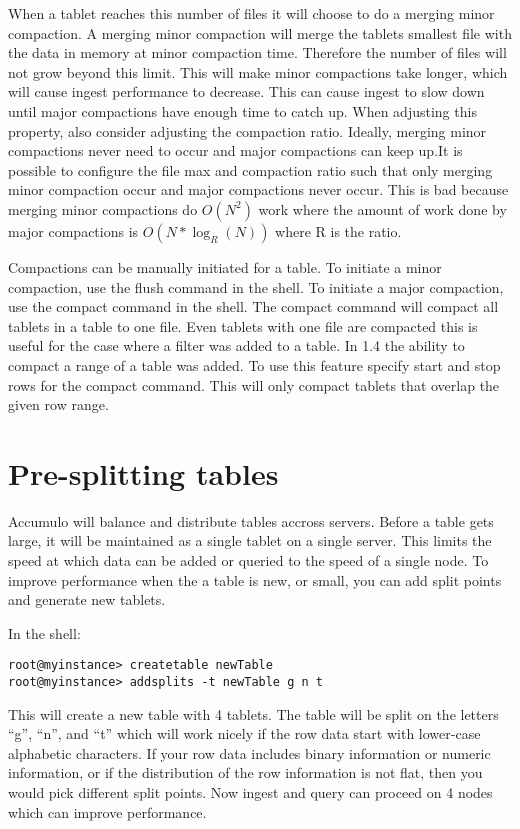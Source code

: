 When a tablet reaches this number of files it will choose to do a merging minor
compaction.  A merging minor compaction will merge the tablets smallest file
with the data in memory at minor compaction time.  Therefore the number of
files will not grow beyond this limit.  This will make minor compactions take
longer, which will cause ingest performance to decrease.  This can cause ingest
to slow down until major compactions have enough time to catch up.   When
adjusting this property, also consider adjusting the compaction ratio.
Ideally, merging minor compactions never need to occur and major compactions
can keep up.It is possible to configure the file max and compaction ratio such
that only merging minor compaction occur and major compactions never occur.
This is bad because merging minor compactions do $O(N^2)$ work where the amount
of work done by major compactions is $O(N*\log_R(N))$ where R is the ratio.
 

Compactions can be manually initiated for a table.  To initiate a minor
compaction, use the flush command in the shell.  To initiate a major compaction,
use the compact command in the shell.  The compact command will compact all
tablets in a table to one file.  Even tablets with one file are compacted this
is useful for the case where a filter was added to a table.  In 1.4 the ability
to compact a range of a table was added.  To use this feature specify start and
stop rows for the compact command.  This will only compact tablets that overlap
the given row range. 

\section{Pre-splitting tables}

Accumulo will balance and distribute tables accross servers. Before a
table gets large, it will be maintained as a single tablet on a single
server.  This limits the speed at which data can be added or queried
to the speed of a single node. To improve performance when the a table
is new, or small, you can add split points and generate new tablets.

In the shell:

\small
\begin{verbatim}
root@myinstance> createtable newTable
root@myinstance> addsplits -t newTable g n t
\end{verbatim}
\normalsize

This will create a new table with 4 tablets.  The table will be split
on the letters ``g'', ``n'', and ``t'' which will work nicely if the
row data start with lower-case alphabetic characters.  If your row
data includes binary information or numeric information, or if the
distribution of the row information is not flat, then you would pick
different split points.  Now ingest and query can proceed on 4 nodes
which can improve performance.

